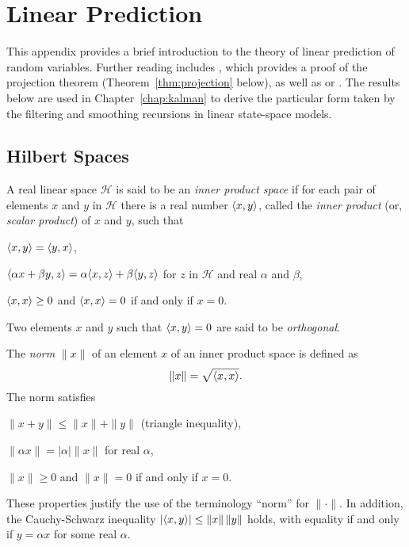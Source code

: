 \chapter{Linear Prediction}
\label{sec:appendix:L2}
\label{sec:appendix:linear_prediction}

%
{}

This appendix provides a brief introduction to the theory of linear prediction of
random variables. Further reading includes
\cite[Chapter~2]{brockwell:davis:1991}, which provides a proof of
the projection theorem
(Theorem~\ref{thm:projection} below), as well as \cite{williams:1991} or
\cite[Chapter 22]{jacod:protter:2000}. The results below are used in
Chapter~\ref{chap:kalman} to derive the particular form taken by the filtering
and smoothing recursions in linear state-space models.

\section{Hilbert Spaces}

\begin{defi}
A real linear space $\mathcal{H}$ is said to be an
\emph{inner product space} if for each pair of elements
$x$ and $y$ in $\mathcal{H}$ there is a real number
$\langle x, y \rangle$, called the \emph{inner product}
(or, \emph{scalar product}) of $x$ and $y$, such that
\begin{enum_a}
\item $\langle x, y \rangle= \langle y, x \rangle$,
\item $\langle \alpha x + \beta y, z \rangle= \alpha \langle x, z \rangle + \beta \langle y, z \rangle$ for $z$ in $\mathcal{H}$ and real $\alpha$ and $\beta$,
\item $\langle x, x \rangle \geq 0$ and $\langle x, x \rangle= 0$ if and only if $x = 0$.
\end{enum_a}
\end{defi}
Two elements $x$ and $y$ such that $\langle x, y \rangle=0$ are said to be
\emph{orthogonal}.

The \emph{norm} $\| x \|$ of an element $x$ of an inner product space
is defined as
\begin{equation}
\label{eq:definition-norm}
\| x \|= \sqrt{\langle x, x \rangle}.
\end{equation}
The norm satisfies
\begin{enum_a}
\item $\| x + y \| \leq \| x \| + \| y \|$ (triangle inequality),
\item $\| \alpha x \| = |\alpha| \| x \|$ for real $\alpha$,
\item $\|x \| \geq 0$ and $\| x \|= 0$ if and only if $x= 0$.
\end{enum_a}
These properties justify the use of the terminology ``norm''
for $\| \cdot \|$. In addition, the Cauchy-Schwarz inequality
$|\langle x, y \rangle|\leq \| x\|\,\|y\|$ holds, with equality
if and only if $y=\alpha x$ for some real $\alpha$.

